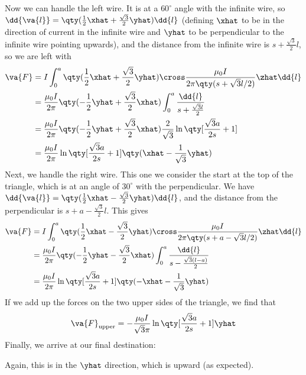 \documentclass[12pt,a4paper]{article}
\begin{document}
Now we can handle the left wire.
It is at a $60^{\circ}$ angle with the infinite wire, so $\dd{\va{l}} = \qty(\frac{1}{2}\xhat + \frac{\sqrt{3}}{2}\yhat)\dd{l}$ (defining $\xhat$ to be in the direction of current in the infinite wire and $\yhat$ to be perpendicular to the infinite wire pointing upwards), and the distance from the infinite wire is $s + \frac{\sqrt{3}}{2}l$, so we are left with
\begin{align*}
\va{F} &= I\int_{0}^{a} \qty(\frac{1}{2}\xhat + \frac{\sqrt{3}}{2}\yhat) \cross \frac{\mu_0 I}{2 \pi \qty(s + \sqrt{3} l/2)}\zhat \dd{l} \\
&= \frac{\mu_0 I}{2 \pi}\qty(-\frac{1}{2}\yhat + \frac{\sqrt{3}}{2}\xhat)\int_{0}^{a} \frac{\dd{l}}{s + \frac{\sqrt{3} l}{2}} \\
&= \frac{\mu_0 I}{2 \pi}\qty(-\frac{1}{2}\yhat + \frac{\sqrt{3}}{2}\xhat)\frac{2}{\sqrt{3}}\ln\qty[\frac{\sqrt{3} a}{2 s} + 1] \\
&= \frac{\mu_0 I}{2 \pi}\ln\qty[\frac{\sqrt{3} a}{2 s} + 1]\qty(\xhat - \frac{1}{\sqrt{3}}\yhat)
\end{align*}
Next, we handle the right wire. This one we consider the start at the top of the triangle, which is at an angle of $30^{\circ}$ with the perpendicular.
We have $\dd{\va{l}} = \qty(\frac{1}{2}\xhat - \frac{\sqrt{3}}{2}\yhat)\dd{l}$, and the distance from the perpendicular is $s + a - \frac{\sqrt{3}}{2}l$.
This gives
\begin{align*}
\va{F} &= I\int_{0}^{a} \qty(\frac{1}{2}\xhat - \frac{\sqrt{3}}{2}\yhat) \cross \frac{\mu_0 I}{2 \pi \qty(s + a - \sqrt{3} l/2)}\zhat \dd{l} \\
&= \frac{\mu_0 I}{2 \pi}\qty(-\frac{1}{2}\yhat - \frac{\sqrt{3}}{2}\xhat)\int_{0}^{a} \frac{\dd{l}}{s - \frac{\sqrt{3} (l-a)}{2}} \\
&= \frac{\mu_0 I}{2 \pi}\ln\qty[\frac{\sqrt{3} a}{2 s} + 1]\qty(- \xhat - \frac{1}{\sqrt{3}}\yhat )
\end{align*}
If we add up the forces on the two upper sides of the triangle, we find that
\begin{align*}
\va{F}_{\rm upper} = - \frac{\mu_0 I}{\sqrt{3} \pi}\ln\qty[\frac{\sqrt{3} a}{2 s} + 1] \yhat
\end{align*}
Finally, we arrive at our final destination:
Again, this is in the $\yhat$ direction, which is upward (as expected).
\end{document}
